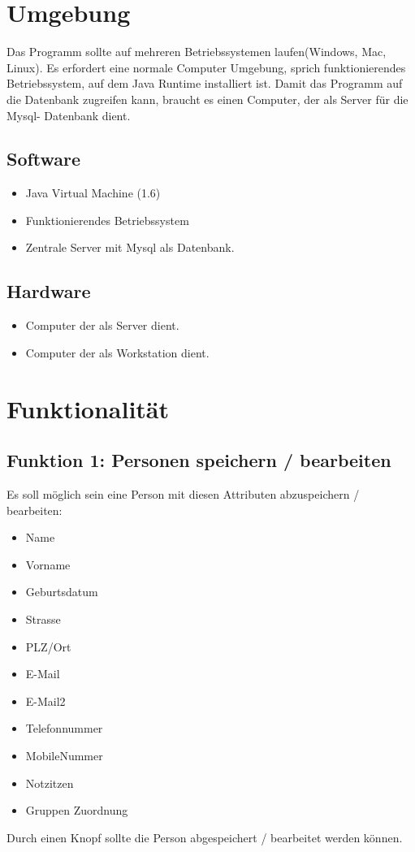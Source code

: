 \section{Umgebung}
Das Programm sollte auf mehreren Betriebssystemen laufen(Windows, Mac, Linux).
Es erfordert eine normale Computer Umgebung, sprich funktionierendes
Betriebssystem, auf dem Java Runtime installiert ist. Damit das Programm auf die
Datenbank zugreifen kann, braucht es einen Computer, der als Server für die Mysql-
Datenbank dient.
%
\subsection{Software}
\begin{itemize}
\item Java Virtual Machine (1.6)
\item Funktionierendes Betriebssystem
\item Zentrale Server mit Mysql als Datenbank.
\end{itemize}
%
\subsection{Hardware}
\begin{itemize}
\item Computer der als Server dient.
\item Computer der als Workstation dient.
\end{itemize}
\section{Funktionalität}
\subsection{Funktion 1: Personen speichern / bearbeiten}
Es soll möglich sein eine Person mit diesen Attributen abzuspeichern / bearbeiten:
\begin{multicols}{2}
\begin{itemize}
\item Name
\item Vorname
\item Geburtsdatum
\item Strasse
\item PLZ/Ort
\item E-Mail
\item E-Mail2
\item Telefonnummer
\item MobileNummer
\item Notzitzen
\item Gruppen Zuordnung
\end{itemize}
\end{multicols}
Durch einen Knopf sollte die Person abgespeichert / bearbeitet werden können.
%
